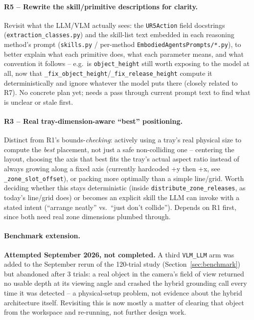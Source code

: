 \paragraph{R5 -- Rewrite the skill/primitive descriptions for clarity.}
Revisit what the LLM/VLM actually sees: the \texttt{UR5Action} field
docstrings (\texttt{extraction\_classes.py}) and the skill-list text embedded
in each reasoning method's prompt (\texttt{skills.py} / per-method
\texttt{EmbodiedAgentsPrompts/*.py}), to better explain what each primitive
does, what each parameter means, and what convention it follows -- e.g.\ is
\texttt{object\_height} still worth exposing to the model at all, now that
\texttt{\_fix\_object\_height}/\texttt{\_fix\_release\_height} compute it
deterministically and ignore whatever the model puts there (closely related
to R7). No concrete plan yet; needs a pass through current prompt text to
find what is unclear or stale first.

\paragraph{R3 -- Real tray-dimension-aware ``best'' positioning.} Distinct
from R1's bounds-\emph{checking}: actively using a tray's real physical size
to compute the \emph{best} placement, not just a safe non-colliding one --
centering the layout, choosing the axis that best fits the tray's actual
aspect ratio instead of always growing along a fixed axis (currently
hardcoded +y then +x, see \texttt{\_zone\_slot\_offset}), or packing more
optimally than a simple line/grid. Worth deciding whether this stays
deterministic (inside \texttt{distribute\_zone\_releases}, as today's
line/grid does) or becomes an explicit skill the LLM can invoke with a
stated intent (``arrange neatly'' vs.\ ``just don't collide''). Depends on
R1 first, since both need real zone dimensions plumbed through.

\paragraph{Benchmark extension.} \textbf{Attempted September 2026, not
completed.} A third \texttt{VLM\_LLM} arm was added to the September rerun
of the 120-trial study (Section~\ref{sec:benchmark}) but abandoned after 3
trials: a real object in the camera's field of view returned no usable
depth at its viewing angle and crashed the hybrid grounding call every time
it was detected -- a physical-setup problem, not evidence about the hybrid
architecture itself. Revisiting this is now mostly a matter of clearing
that object from the workspace and re-running, not further design work.

